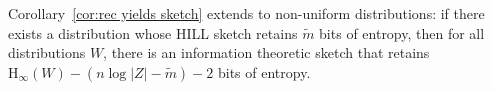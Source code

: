 \documentclass[11pt]{article}
\newcommand{\corref}[1]{\mbox{Corollary~\ref{#1}}}
\newcommand{\propref}[1]{\mbox{Proposition~\ref{#1}}}
\newcommand{\class}[1]{{\ensuremath{\mathsf{#1}}}}
\newcommand{\sketch}{\ensuremath{\class{SS}}\xspace}
\newcommand{\Hoo}{\mathrm{H}_\infty}
\newcommand{\Hav}{\tilde{\mathrm{H}}_\infty}
\newtheorem{proposition}[theorem]{Proposition}
\begin{document}
\corref{cor:rec yields sketch} extends to non-uniform distributions: if there exists a distribution whose HILL sketch retains $\tilde{m}$ bits of entropy, then for all distributions $W$, there is an information theoretic sketch that retains $\Hoo(W) - (n\log |Z|-\tilde{m})-2$ bits of entropy.



\end{document}
